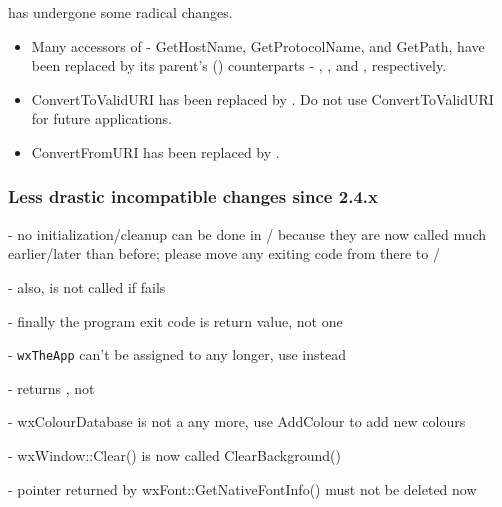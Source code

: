  has undergone some radical changes.

\begin{itemize}\itemsep=0pt
\item Many accessors of  - GetHostName, GetProtocolName, and GetPath,
      have been replaced by its parent's () counterparts - ,
      , and , respectively.

\item ConvertToValidURI has been replaced by .  Do not use
      ConvertToValidURI for future applications.

\item ConvertFromURI has been replaced by .
\end{itemize}



\subsubsection{Less drastic incompatible changes since 2.4.x}\label{24incompatiblelessdrastic}

- no initialization/cleanup can be done in / because they are
  now called much earlier/later than before; please move any exiting code
  from there to /

- also,  is not called if  fails

- finally the program exit code is  return value, not  one

- \texttt{wxTheApp} can't be assigned to any longer, use  instead

-  returns , not 

- wxColourDatabase is not a  any more, use AddColour to add new colours

- wxWindow::Clear() is now called ClearBackground()

- pointer returned by wxFont::GetNativeFontInfo() must not be deleted now

